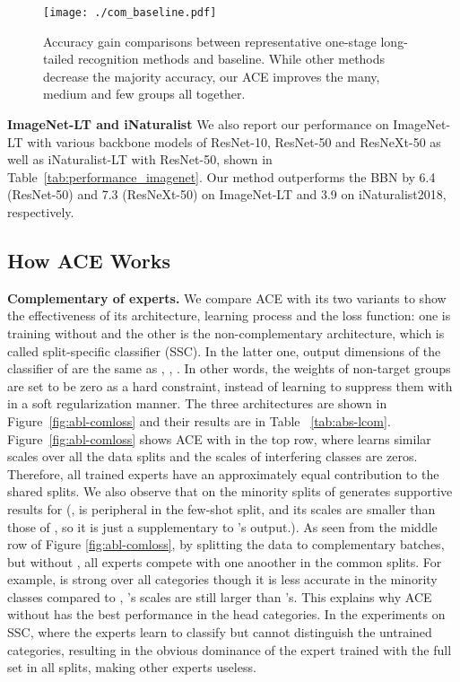 \documentclass[10pt,twocolumn,letterpaper]{article}
\begin{document}
\begin{figure}[h]
\begin{center}
\texttt{[image: ./com\_baseline.pdf]}
\end{center}
   \caption{Accuracy gain comparisons between representative one-stage long-tailed recognition methods and baseline. While other methods decrease the majority accuracy, our ACE improves the many, medium and few groups all together.}
\label{fig:result}
\end{figure}


\textbf{ImageNet-LT and iNaturalist} We also report our performance on ImageNet-LT with various backbone models of ResNet-10, ResNet-50 and ResNeXt-50 as well as iNaturalist-LT with ResNet-50, shown in Table~\ref{tab:performance_imagenet}. Our method outperforms the BBN by 6.4 (ResNet-50) and  7.3 (ResNeXt-50) on ImageNet-LT and 3.9 on iNaturalist2018, respectively.


\subsection{How ACE Works}
\label{abs}
\textbf{Complementary of experts.} We compare ACE with its two variants to show the effectiveness of its architecture, learning process and the loss function: one is training without  and the other is the non-complementary architecture, which is called split-specific classifier (SSC). In the latter one, output dimensions of the classifier of  are the same as , \ie, . In other words, the weights of non-target groups are set to be zero as a hard constraint, instead of learning to suppress them with  in a soft regularization manner. The three architectures are shown in Figure~\ref{fig:abl-comloss} and their results are in Table ~\ref{tab:abs-lcom}. Figure~\ref{fig:abl-comloss} shows ACE with  in the top row, where  learns similar scales over all the data splits and the scales of interfering classes are zeros. Therefore, all trained experts have an approximately equal contribution to the shared splits. We also observe that on the minority splits  of   generates supportive results for  (\eg,  is peripheral in the few-shot split, and its scales are smaller than those of , so it is just a supplementary to 's output.). As seen from the middle row of Figure \ref{fig:abl-comloss}, by splitting the data to complementary batches, but without , all experts  compete with one anoother in the common splits. For example,  is strong over all categories though it is less accurate in the minority classes compared to , 's scales are still larger than 's. This explains why ACE without  has the best performance in the head categories. In the experiments on SSC, where the experts learn to classify  but cannot distinguish the untrained categories, resulting in the obvious dominance of the expert trained with the full set in all splits, making other experts useless. 
\end{document}
